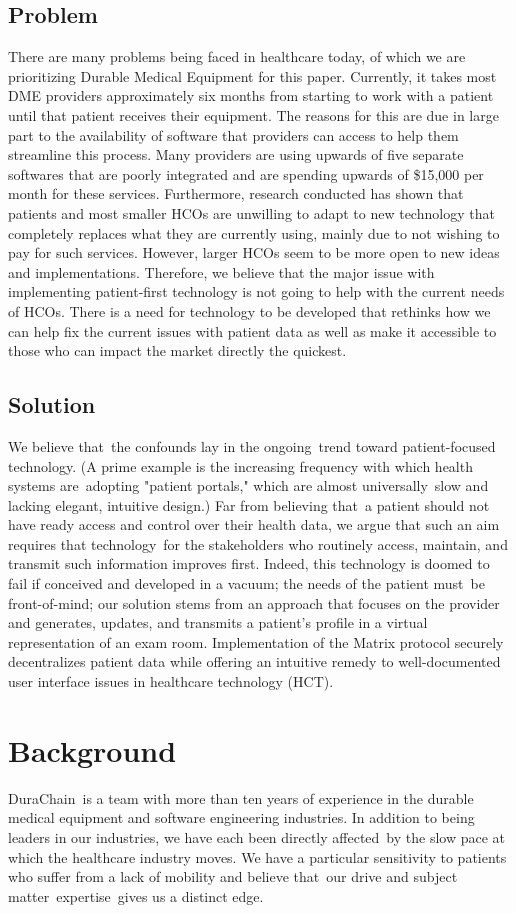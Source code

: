 \documentclass[letterpaper]{article}
\begin{document}
\subsection{Problem}
There are many problems being faced in healthcare today, of which we are prioritizing Durable Medical Equipment for this paper. Currently, it takes most DME providers approximately six months from starting to work with a patient until that patient receives their equipment. The reasons for this are due in large part to the availability of software that providers can access to help them streamline this process. Many providers are using upwards of five separate softwares that are poorly integrated and are spending upwards of \$15,000 per month for these services. Furthermore, research conducted has shown that patients and most smaller HCOs are unwilling to adapt to new technology that completely replaces what they are currently using, mainly due to not wishing to pay for such services. However, larger HCOs seem to be more open to new ideas and implementations. Therefore, we believe that the major issue with implementing patient-first technology is not going to help with the current needs of HCOs. There is a need for technology to be developed that rethinks how we can help fix the current issues with patient data as well as make it accessible to those who can impact the market directly the quickest.
%
\subsection{Solution}
We believe that the confounds lay in the ongoing trend toward patient-focused technology. (A prime example is the increasing frequency with which health systems are adopting "patient portals," which are almost universally slow and lacking elegant, intuitive design.) Far from believing that a patient should not have ready access and control over their health data, we argue that such an aim requires that technology for the stakeholders who routinely access, maintain, and transmit such information improves first.
%
Indeed, this technology is doomed to fail if conceived and developed in a vacuum; the needs of the patient must be front-of-mind; our solution stems from an approach that focuses on the provider and generates, updates, and transmits a patient's profile in a virtual representation of an exam room. Implementation of the Matrix protocol securely decentralizes patient data while offering an intuitive remedy to well-documented user interface issues in healthcare technology (HCT).
%
\section{Background}
DuraChain is a team with more than ten years of experience in the durable medical equipment and software engineering industries. In addition to being leaders in our industries, we have each been directly affected by the slow pace at which the healthcare industry moves. We have a particular sensitivity to patients who suffer from a lack of mobility and believe that our drive and subject matter expertise gives us a distinct edge.
%
\end{document}
